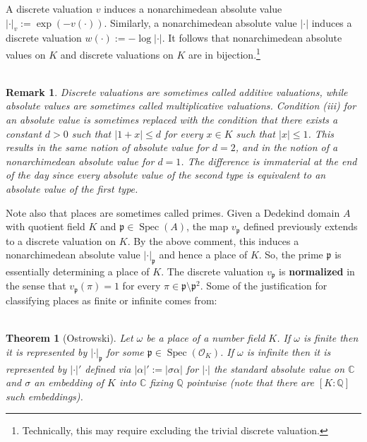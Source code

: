 \documentclass[11pt]{article}
\newcommand{\C}{\mathbb{C}}
\newcommand{\Q}{\mathbb{Q}}
\newcommand{\abs}[1]{\left\lvert#1\right\rvert}
\newcommand{\mc}[1]{\mathcal{#1}}
\newcommand{\mf}[1]{\mathfrak{#1}}
\DeclareMathOperator{\Spec}{Spec}
\renewcommand{\O}{\mc{O}}
\newtheorem*{remark*}{\\Remark}
\newtheorem*{theorem*}{\\Theorem}
\begin{document}
A discrete valuation $v$ induces a nonarchimedean absolute value $\abs{\cdot}_v:=\exp(-v(\cdot))$. Similarly, a nonarchimedean absolute value $\abs{\cdot}$ induces a discrete valuation $w(\cdot):=-\log\abs{\cdot}$. It follows that nonarchimedean absolute values on $K$ and discrete valuations on $K$ are in bijection.\footnote{Technically, this may require excluding the trivial discrete valuation.}

\begin{remark*}
Discrete valuations are sometimes called additive valuations, while absolute values are sometimes called multiplicative valuations. Condition \emph{(iii)} for an absolute value is sometimes replaced with the condition that there exists a constant $d>0$ such that $|1+x|\leq d$ for every $x\in K$ such that $|x|\leq1$. This results in the same notion of absolute value for $d=2$, and in the notion of a nonarchimedean absolute value for $d=1$. The difference is immaterial at the end of the day since every absolute value of the second type is equivalent to an absolute value of the first type.
\end{remark*}

Note also that places are sometimes called primes. Given a Dedekind domain $A$ with quotient field $K$ and $\mf{p}\in\Spec(A)$, the map $v_{\mf{p}}$ defined previously extends to a discrete valuation on $K$. By the above comment, this induces a nonarchimedean absolute value $\abs{\cdot}_{\mf{p}}$ and hence a place of $K$. So, the prime $\mf{p}$ is essentially determining a place of $K$. The discrete valuation $v_{\mf{p}}$ is \textbf{normalized} in the sense that $v_{\mf{p}}(\pi)=1$ for every $\pi\in\mf{p}\setminus\mf{p}^2$. Some of the justification for classifying places as finite or infinite comes from:

\begin{theorem*}[Ostrowski]
Let $\omega$ be a place of a number field $K$. If $\omega$ is finite then it is represented by $\abs{\cdot}_{\mf{p}}$ for some $\mf{p}\in\Spec(\O_K)$. If $\omega$ is infinite then it is represented by $\abs{\cdot}'$ defined via $|\alpha|':=|\sigma\alpha|$ for $\abs{\cdot}$ the standard absolute value on $\C$ and $\sigma$ an embedding of $K$ into $\C$ fixing $\Q$ pointwise (note that there are $[K:\Q]$ such embeddings). 
\end{theorem*}
\end{document}
